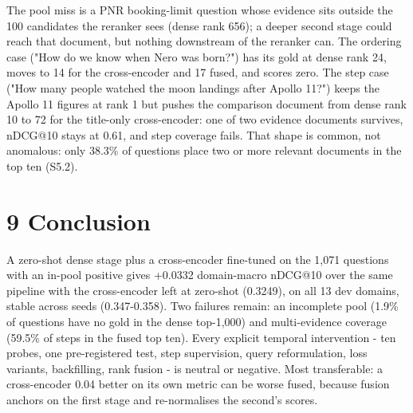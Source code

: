 \documentclass[11pt]{article}
\begin{document}
\begin{table}[t]
\centering
\footnotesize
{}%
\end{table}

The pool miss is a PNR booking-limit question whose evidence sits outside the 100 candidates the reranker sees (dense rank 656); a deeper second stage could reach that document, but nothing downstream of the reranker can. The ordering case ("How do we know when Nero was born?") has its gold at dense rank 24, moves to 14 for the cross-encoder and 17 fused, and scores zero. The step case ("How many people watched the moon landings after Apollo 11?") keeps the Apollo 11 figures at rank 1 but pushes the comparison document from dense rank 10 to 72 for the title-only cross-encoder: one of two evidence documents survives, nDCG@10 stays at 0.61, and step coverage fails. That shape is common, not anomalous: only 38.3\% of questions place two or more relevant documents in the top ten (S5.2).

\section*{9 Conclusion}
A zero-shot dense stage plus a cross-encoder fine-tuned on the 1,071 questions with an in-pool positive gives +0.0332 domain-macro nDCG@10 over the same pipeline with the cross-encoder left at zero-shot (0.3249), on all 13 dev domains, stable across seeds (0.347-0.358). Two failures remain: an incomplete pool (1.9\% of questions have no gold in the dense top-1,000) and multi-evidence coverage (59.5\% of steps in the fused top ten). Every explicit temporal intervention - ten probes, one pre-registered test, step supervision, query reformulation, loss variants, backfilling, rank fusion - is neutral or negative. Most transferable: a cross-encoder 0.04 better on its own metric can be worse fused, because fusion anchors on the first stage and re-normalises the second’s scores.
\end{document}

